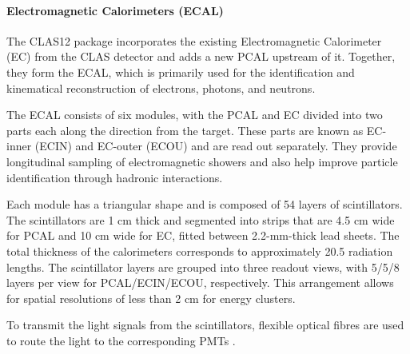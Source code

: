 \paragraph{Electromagnetic Calorimeters (ECAL)}
    The CLAS12 package incorporates the existing Electromagnetic Calorimeter (EC) from the CLAS detector and adds a new PCAL upstream of it.
    Together, they form the ECAL, which is primarily used for the identification and kinematical reconstruction of electrons, photons, and neutrons.

    The ECAL consists of six modules, with the PCAL and EC divided into two parts each along the direction from the target.
    These parts are known as EC-inner (ECIN) and EC-outer (ECOU) and are read out separately.
    They provide longitudinal sampling of electromagnetic showers and also help improve particle identification through hadronic interactions.

    Each module has a triangular shape and is composed of 54 layers of scintillators.
    The scintillators are 1 cm thick and segmented into strips that are 4.5 cm wide for PCAL and 10 cm wide for EC, fitted between 2.2-mm-thick lead sheets.
    The total thickness of the calorimeters corresponds to approximately 20.5 radiation lengths.
    The scintillator layers are grouped into three readout views, with 5/5/8 layers per view for PCAL/ECIN/ECOU, respectively.
    This arrangement allows for spatial resolutions of less than 2 cm for energy clusters.

    To transmit the light signals from the scintillators, flexible optical fibres are used to route the light to the corresponding PMTs \cite{asryan2020}.
